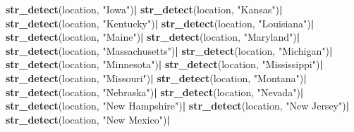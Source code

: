 \documentclass[
]{article}
\newenvironment{Shaded}{\begin{snugshade}}{\end{snugshade}}
\newcommand{\KeywordTok}[1]{\textcolor[rgb]{0.13,0.29,0.53}{\textbf{#1}}}
\newcommand{\NormalTok}[1]{#1}
\newcommand{\OperatorTok}[1]{\textcolor[rgb]{0.81,0.36,0.00}{\textbf{#1}}}
\newcommand{\StringTok}[1]{\textcolor[rgb]{0.31,0.60,0.02}{#1}}
\begin{document}
\begin{Shaded}
\begin{Highlighting}[]
{{\StringTok{                                                  }\KeywordTok{str_detect}\NormalTok{(location, }\StringTok{"Iowa"}\NormalTok{)}\OperatorTok{|}
\StringTok{                                                  }\KeywordTok{str_detect}\NormalTok{(location, }\StringTok{"Kansas"}\NormalTok{)}\OperatorTok{|}
\StringTok{                                                  }\KeywordTok{str_detect}\NormalTok{(location, }\StringTok{"Kentucky"}\NormalTok{)}\OperatorTok{|}
\StringTok{                                                  }\KeywordTok{str_detect}\NormalTok{(location, }\StringTok{"Louisiana"}\NormalTok{)}\OperatorTok{|}
\StringTok{                                                  }\KeywordTok{str_detect}\NormalTok{(location, }\StringTok{"Maine"}\NormalTok{)}\OperatorTok{|}
\StringTok{                                                  }\KeywordTok{str_detect}\NormalTok{(location, }\StringTok{"Maryland"}\NormalTok{)}\OperatorTok{|}
\StringTok{                                                  }\KeywordTok{str_detect}\NormalTok{(location, }\StringTok{"Massachusetts"}\NormalTok{)}\OperatorTok{|}
\StringTok{                                                  }\KeywordTok{str_detect}\NormalTok{(location, }\StringTok{"Michigan"}\NormalTok{)}\OperatorTok{|}
\StringTok{                                                  }\KeywordTok{str_detect}\NormalTok{(location, }\StringTok{"Minnesota"}\NormalTok{)}\OperatorTok{|}
\StringTok{                                                  }\KeywordTok{str_detect}\NormalTok{(location, }\StringTok{"Mississippi"}\NormalTok{)}\OperatorTok{|}
\StringTok{                                                  }\KeywordTok{str_detect}\NormalTok{(location, }\StringTok{"Missouri"}\NormalTok{)}\OperatorTok{|}
\StringTok{                                                  }\KeywordTok{str_detect}\NormalTok{(location, }\StringTok{"Montana"}\NormalTok{)}\OperatorTok{|}
\StringTok{                                                  }\KeywordTok{str_detect}\NormalTok{(location, }\StringTok{"Nebraska"}\NormalTok{)}\OperatorTok{|}
\StringTok{                                                  }\KeywordTok{str_detect}\NormalTok{(location, }\StringTok{"Nevada"}\NormalTok{)}\OperatorTok{|}
\StringTok{                                                  }\KeywordTok{str_detect}\NormalTok{(location, }\StringTok{"New Hampshire"}\NormalTok{)}\OperatorTok{|}
\StringTok{                                                  }\KeywordTok{str_detect}\NormalTok{(location, }\StringTok{"New Jersey"}\NormalTok{)}\OperatorTok{|}
\StringTok{                                                  }\KeywordTok{str_detect}\NormalTok{(location, }\StringTok{"New Mexico"}\NormalTok{)}\OperatorTok{|}
}}
\end{Highlighting}
\end{Shaded}
\end{document}
